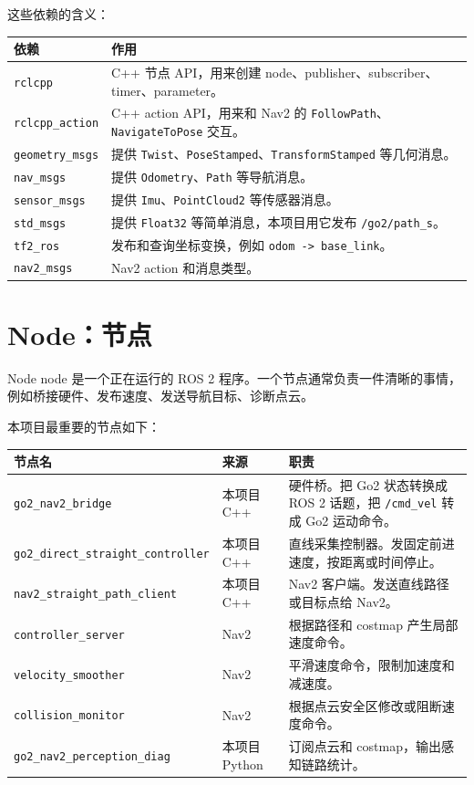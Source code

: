 \documentclass[UTF8,11pt,a4paper,openany]{ctexrep}
\newcommand{\code}[1]{\nolinkurl{#1}}
\newcommand{\pkg}[1]{\nolinkurl{#1}}
\newcommand{\topic}[1]{\nolinkurl{#1}}
\newcommand{\rosnode}[1]{\nolinkurl{#1}}
\newcommand{\msg}[1]{\nolinkurl{#1}}
\newcommand{\actionname}[1]{\nolinkurl{#1}}
\begin{document}
这些依赖的含义：

\begin{longtable}{L{0.22\textwidth} L{0.68\textwidth}}
\toprule
\textbf{依赖} & \textbf{作用} \\
\midrule
\endhead
\pkg{rclcpp} & C++ 节点 API，用来创建 node、publisher、subscriber、timer、parameter。\\
\pkg{rclcpp_action} & C++ action API，用来和 Nav2 的 \actionname{FollowPath}、\actionname{NavigateToPose} 交互。\\
\pkg{geometry_msgs} & 提供 \msg{Twist}、\msg{PoseStamped}、\msg{TransformStamped} 等几何消息。\\
\pkg{nav_msgs} & 提供 \msg{Odometry}、\msg{Path} 等导航消息。\\
\pkg{sensor_msgs} & 提供 \msg{Imu}、\msg{PointCloud2} 等传感器消息。\\
\pkg{std_msgs} & 提供 \msg{Float32} 等简单消息，本项目用它发布 \topic{/go2/path_s}。\\
\pkg{tf2_ros} & 发布和查询坐标变换，例如 \code{odom -> base_link}。\\
\pkg{nav2_msgs} & Nav2 action 和消息类型。\\
\bottomrule
\end{longtable}

\section{Node：节点}

\begin{termdef}{Node}
node 是一个正在运行的 ROS 2 程序。一个节点通常负责一件清晰的事情，例如桥接硬件、发布速度、发送导航目标、诊断点云。
\end{termdef}

本项目最重要的节点如下：

\begin{longtable}{L{0.30\textwidth} L{0.24\textwidth} L{0.36\textwidth}}
\toprule
\textbf{节点名} & \textbf{来源} & \textbf{职责} \\
\midrule
\endhead
\rosnode{go2_nav2_bridge} & 本项目 C++ & 硬件桥。把 Go2 状态转换成 ROS 2 话题，把 \topic{/cmd_vel} 转成 Go2 运动命令。\\
\rosnode{go2_direct_straight_controller} & 本项目 C++ & 直线采集控制器。发固定前进速度，按距离或时间停止。\\
\rosnode{nav2_straight_path_client} & 本项目 C++ & Nav2 客户端。发送直线路径或目标点给 Nav2。\\
\rosnode{controller_server} & Nav2 & 根据路径和 costmap 产生局部速度命令。\\
\rosnode{velocity_smoother} & Nav2 & 平滑速度命令，限制加速度和减速度。\\
\rosnode{collision_monitor} & Nav2 & 根据点云安全区修改或阻断速度命令。\\
\rosnode{go2_nav2_perception_diag} & 本项目 Python & 订阅点云和 costmap，输出感知链路统计。\\
\bottomrule
\end{longtable}
\end{document}
